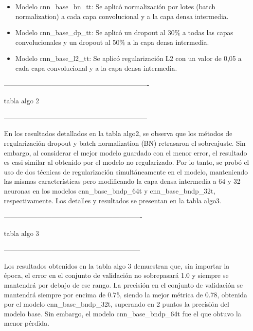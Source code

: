 \begin{itemize}
\item Modelo cnn\_base\_bn\_tt: Se aplicó normalización por lotes (batch normalization) a cada capa convolucional y a la capa densa intermedia.
\item Modelo cnn\_base\_dp\_tt: Se aplicó un dropout al 30\% a todas las capas convolucionales y un dropout al 50\% a la capa densa intermedia.
\item Modelo cnn\_base\_l2\_tt: Se aplicó regularización L2 con un valor de 0,05 a cada capa convolucional y a la capa densa intermedia.
\end{itemize}

----------------------------------------------------------------

tabla algo 2

---------------------------------------------------------------

En los resultados detallados en la tabla algo2, se observa que los métodos de regularización dropout y batch normalization (BN) retrasaron el sobreajuste. Sin embargo, al considerar el mejor modelo guardado con el menor error, el resultado es casi similar al obtenido por el modelo no regularizado. Por lo tanto, se probó el uso de dos técnicas de regularización simultáneamente en el modelo, manteniendo las mismas características pero modificando la capa densa intermedia a 64 y 32 neuronas en los modelos cnn\_base\_bndp\_64t y cnn\_base\_bndp\_32t, respectivamente. Los detalles y resultados se presentan en la tabla algo3.

-------------------------------------------------------------

tabla algo 3

------------------------------------------------------------

Los resultados obtenidos en la tabla algo 3 demuestran que, sin importar la época, el error en el conjunto de validación no sobrepasará 1.0 y siempre se mantendrá por debajo de ese rango. La precisión en el conjunto de validación se mantendrá siempre por encima de 0.75, siendo la mejor métrica de 0.78, obtenida por el modelo cnn\_base\_bndp\_32t, superando en 2 puntos la precisión del modelo base. Sin embargo, el modelo cnn\_base\_bndp\_64t fue el que obtuvo la menor pérdida.
